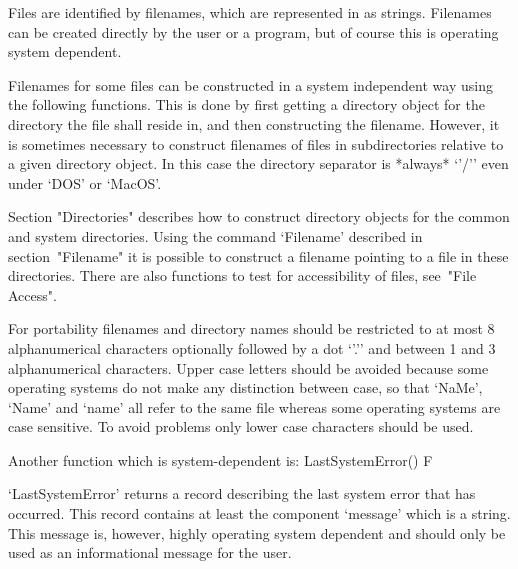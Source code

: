 


Files are identified by filenames, which are represented in {\GAP} as
strings.  Filenames can be created directly by the user or a program, but
of course this is operating system dependent.

Filenames for some files can  be constructed in  a system independent way
using the following functions.  This is done by first getting a directory
object for the directory the file shall  reside in, and then constructing
the filename.  However, it is  sometimes necessary to construct filenames
of files in subdirectories relative to a given directory object.  In this
case  the  directory separator is  *always*  `{'/'}' even under  `DOS' or
`MacOS'.

Section "Directories" describes how  to  construct directory objects
for the common {\GAP} and system directories.
Using the command `Filename' described in section~"Filename"
it is possible to construct a filename pointing to a file in these
directories.
There are also functions to test for accessibility of files,
see~"File Access".


For portability filenames and directory  names should be restricted to at
most   8 alphanumerical characters  optionally followed  by a dot `{'.'}'
and between 1 and 3 alphanumerical characters.  Upper case letters should
be  avoided because some  operating systems  do  not make any distinction
between case,  so that `NaMe', `Name'  and  `name' all  refer to the same
file  whereas  some   operating  systems are case   sensitive.   To avoid
problems only lower case characters should be used.

Another function which is system-dependent is:
\>LastSystemError() F

`LastSystemError' returns  a  record describing the   last system error that
has occurred.
This record   contains  at least   the  component  `message' which   is a
string. This message is, however,  highly operating system dependent  and
should only be used as an informational message for the user.

